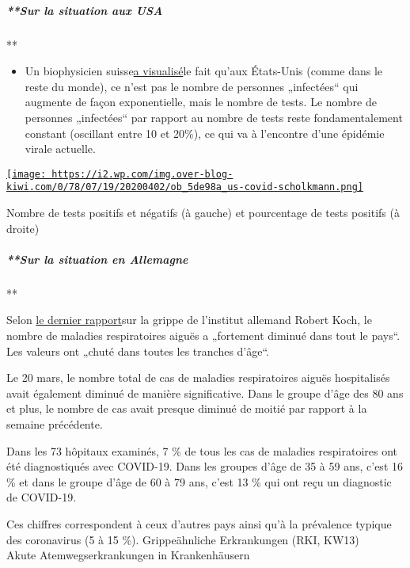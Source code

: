 \hypertarget{sur-la-situation-aux-usa}{%
\subparagraph{**Sur la situation aux
USA}\label{sur-la-situation-aux-usa}}

**

\begin{itemize}
\tightlist
\item
  Un biophysicien
  suisse\href{https://swprs.org/rate-of-positive-covid19-tests/}{a
  visualisé}le fait qu'aux États-Unis (comme dans le reste du monde), ce
  n'est pas le nombre de personnes „infectées`` qui augmente de façon
  exponentielle, mais le nombre de tests. Le nombre de personnes
  „infectées`` par rapport au nombre de tests reste fondamentalement
  constant (oscillant entre 10 et 20\%), ce qui va à l'encontre d'une
  épidémie virale actuelle.
\end{itemize}

\href{http://img.over-blog-kiwi.com/0/78/07/19/20200402/ob_5de98a_us-covid-scholkmann.png\#width=600\&height=294}{\texttt{[image: https://i2.wp.com/img.over-blog-kiwi.com/0/78/07/19/20200402/ob\_5de98a\_us-covid-scholkmann.png]}}

Nombre de tests positifs et négatifs (à gauche) et pourcentage de tests
positifs (à droite)

\hypertarget{sur-la-situation-en-allemagne}{%
\subparagraph{**Sur la situation en
Allemagne}\label{sur-la-situation-en-allemagne}}

**

Selon
\href{https://influenza.rki.de/Wochenberichte/2019_2020/2020-13.pdf}{le
dernier rapport}sur la grippe de l'institut allemand Robert Koch, le
nombre de maladies respiratoires aiguës a „fortement diminué dans tout
le pays``. Les valeurs ont „chuté dans toutes les tranches d'âge``.

Le 20 mars, le nombre total de cas de maladies respiratoires aiguës
hospitalisés avait également diminué de manière significative. Dans le
groupe d'âge des 80 ans et plus, le nombre de cas avait presque diminué
de moitié par rapport à la semaine précédente.

Dans les 73 hôpitaux examinés, 7 \% de tous les cas de maladies
respiratoires ont été diagnostiqués avec COVID-19. Dans les groupes
d'âge de 35 à 59 ans, c'est 16 \% et dans le groupe d'âge de 60 à 79
ans, c'est 13 \% qui ont reçu un diagnostic de COVID-19.

Ces chiffres correspondent à ceux d'autres pays ainsi qu'à la prévalence
typique des coronavirus (5 à 15 \%). Grippeähnliche Erkrankungen (RKI,
KW13)\\
Akute Atemwegserkrankungen in Krankenhäusern


